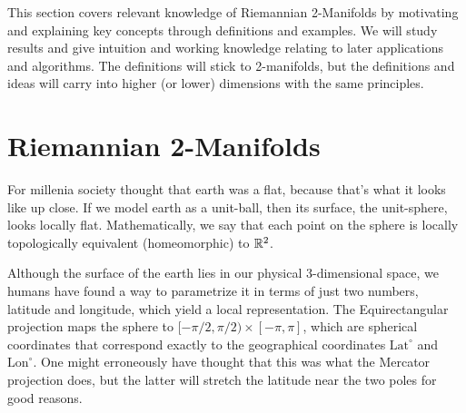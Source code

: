 \ifdefined\COMPILINGFROMMAIN
\else
    
    
\fi
This section covers relevant knowledge of Riemannian 2-Manifolds by motivating and explaining key concepts through definitions and examples. We will study results and give intuition and working knowledge relating to later applications and algorithms. The definitions will stick to 2-manifolds, but the definitions and ideas will carry into higher (or lower) dimensions with the same principles. 

\section*{Riemannian 2-Manifolds}

For millenia society thought that earth was a flat, because that's what it looks like up close. If we model earth as a unit-ball, then its surface, the unit-sphere, looks locally flat. Mathematically, we say that each point on the sphere is locally topologically equivalent (homeomorphic) to $\mathbb{R}^2$.

Although the surface of the earth lies in our physical 3-dimensional space, we humans have found a way to parametrize it in terms of just two numbers, latitude and longitude, which yield a local representation. The Equirectangular projection maps the sphere to $[-\pi/2, \pi/2) \times [-\pi, \pi]$, which are spherical coordinates that correspond exactly to the geographical coordinates $\text{Lat}^\circ$ and $\text{Lon}^\circ$. One might erroneously have thought that this was what the Mercator projection does, but the latter will stretch the latitude near the two poles for good reasons.
    
